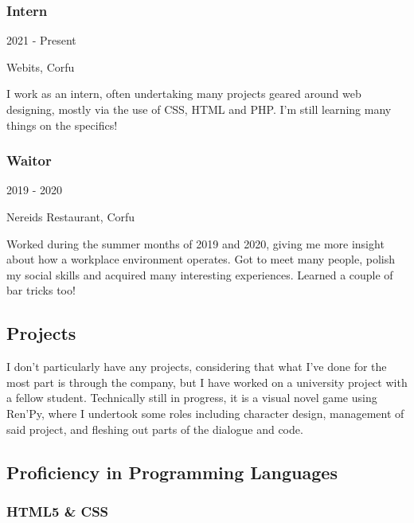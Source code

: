 \documentclass[english,]{article}
\begin{document}
\hypertarget{intern}{%
\subsubsection{Intern}\label{intern}}

2021 - Present

Webits, Corfu

I work as an intern, often undertaking many projects geared around web
designing, mostly via the use of CSS, HTML and PHP. I'm still learning
many things on the specifics!

\hypertarget{waitor}{%
\subsubsection{Waitor}\label{waitor}}

2019 - 2020

Nereids Restaurant, Corfu

Worked during the summer months of 2019 and 2020, giving me more insight
about how a workplace environment operates. Got to meet many people,
polish my social skills and acquired many interesting experiences.
Learned a couple of bar tricks too!

\hypertarget{projects}{%
\subsection{\texorpdfstring{{ \emph{} \emph{} }
Projects}{    Projects}}\label{projects}}

I don't particularly have any projects, considering that what I've done
for the most part is through the company, but I have worked on a
university project with a fellow student. Technically still in progress,
it is a visual novel game using Ren'Py, where I undertook some roles
including character design, management of said project, and fleshing out
parts of the dialogue and code.

\hypertarget{proficiency-in-programming-languages}{%
\subsection{\texorpdfstring{{ \emph{} \emph{} } Proficiency in
Programming
Languages}{    Proficiency in Programming Languages}}\label{proficiency-in-programming-languages}}

\hypertarget{html5-css}{%
\subsubsection{HTML5 \& CSS}\label{html5-css}}
\end{document}
